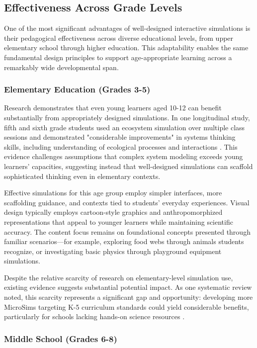 \subsection{Effectiveness Across Grade Levels}

One of the most significant advantages of well-designed interactive simulations is their pedagogical effectiveness across diverse educational levels, from upper elementary school through higher education. This adaptability enables the same fundamental design principles to support age-appropriate learning across a remarkably wide developmental span.

\subsubsection{Elementary Education (Grades 3-5)}

Research demonstrates that even young learners aged 10-12 can benefit substantially from appropriately designed simulations. In one longitudinal study, fifth and sixth grade students used an ecosystem simulation over multiple class sessions and demonstrated "considerable improvements" in systems thinking skills, including understanding of ecological processes and interactions \cite{eric2009}. This evidence challenges assumptions that complex system modeling exceeds young learners' capacities, suggesting instead that well-designed simulations can scaffold sophisticated thinking even in elementary contexts.

Effective simulations for this age group employ simpler interfaces, more scaffolding guidance, and contexts tied to students' everyday experiences. Visual design typically employs cartoon-style graphics and anthropomorphized representations that appeal to younger learners while maintaining scientific accuracy. The content focus remains on foundational concepts presented through familiar scenarios—for example, exploring food webs through animals students recognize, or investigating basic physics through playground equipment simulations.

Despite the relative scarcity of research on elementary-level simulation use, existing evidence suggests substantial potential impact. As one systematic review noted, this scarcity represents a significant gap and opportunity: developing more MicroSims targeting K-5 curriculum standards could yield considerable benefits, particularly for schools lacking hands-on science resources \cite{mdpi2024}.

\subsubsection{Middle School (Grades 6-8)}

